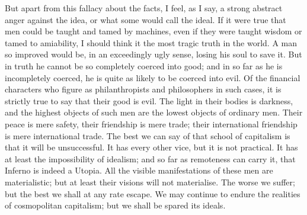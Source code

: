 \documentclass{book}
\begin{document}
But apart from this fallacy about the facts, I feel, as I say, a strong abstract anger against the idea, or what some would call the ideal. If it were true that men could be taught and tamed by machines, even if they were taught wisdom or tamed to amiability, I should think it the most tragic truth in the world. A man so improved would be, in an exceedingly ugly sense, losing his soul to save it. But in truth he cannot be so completely coerced into good; and in so far as he is incompletely coerced, he is quite as likely to be coerced into evil. Of the financial characters who figure as philanthropists and philosophers in such cases, it is strictly true to say that their good is evil. The light in their bodies is darkness, and the highest objects of such men are the lowest objects of ordinary men. Their peace is mere safety, their friendship is mere trade; their international friendship is mere international trade. The best we can say of that school of capitalism is that it will be unsuccessful. It has every other vice, but it is not practical. It has at least the impossibility of idealism; and so far as remoteness can carry it, that Inferno is indeed a Utopia. All the visible manifestations of these men are materialistic; but at least their visions will not materialise. The worse we suffer; but the best we shall at any rate escape. We may continue to endure the realities of cosmopolitan capitalism; but we shall be spared its ideals.
\end{document}
